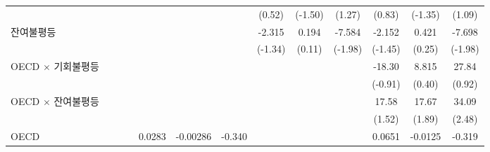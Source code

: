 \begin{table}[htbp]
{\begin{tabular}{l*{12}{c}}
                    &                     &                     &                     &                     &                     &                     &      (0.52)         &     (-1.50)         &      (1.27)         &      (0.83)         &     (-1.35)         &      (1.09)         \\
\addlinespace
잔여불평등        &                     &                     &                     &                     &                     &                     &      -2.315         &       0.194         &      -7.584\sym{**} &      -2.152         &       0.421         &      -7.698\sym{**} \\
                    &                     &                     &                     &                     &                     &                     &     (-1.34)         &      (0.11)         &     (-1.98)         &     (-1.45)         &      (0.25)         &     (-1.98)         \\
\addlinespace
OECD $\times$ 기회불평등&                     &                     &                     &                     &                     &                     &                     &                     &                     &      -18.30         &       8.815         &       27.84         \\
                    &                     &                     &                     &                     &                     &                     &                     &                     &                     &     (-0.91)         &      (0.40)         &      (0.92)         \\
\addlinespace
OECD $\times$ 잔여불평등&                     &                     &                     &                     &                     &                     &                     &                     &                     &       17.58         &       17.67\sym{*}  &       34.09\sym{**} \\
                    &                     &                     &                     &                     &                     &                     &                     &                     &                     &      (1.52)         &      (1.89)         &      (2.48)         \\
\addlinespace
OECD              &                     &                     &                     &      0.0283         &    -0.00286         &      -0.340\sym{*}  &                     &                     &                     &      0.0651         &     -0.0125         &      -0.319         \\

\end{tabular}}
\end{table}
